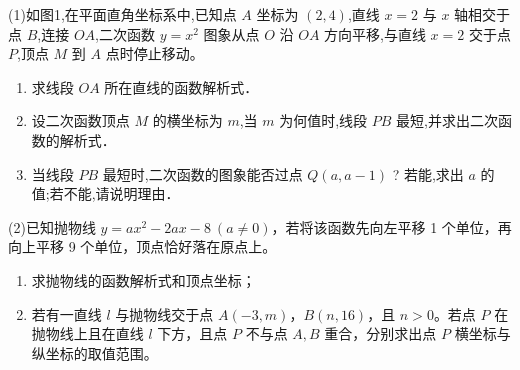 \documentclass[lang=cn, 10pt, titlestyle=display, oneside, toc=twocol]{elegantbook}
\begin{document}
\begin{exercise}
    \small
    \setlength{\parindent}{0pt} %
    \setlength{\columnseprule}{0.01pt}
    \begin{multicols}{2}
    (1)如图1,在平面直角坐标系中,已知点 \( A \) 坐标为 \((2,4)\),直线 \( x=2 \) 与 \( x \) 轴相交于点 \( B \),连接 \( OA \),二次函数 \( y=x^2 \) 图象从点 \( O \) 沿 \( OA \) 方向平移,与直线 \( x=2 \) 交于点 \( P \),顶点 \( M \) 到 \( A \) 点时停止移动。
        
    \begin{enumerate}
        \item 求线段 \( OA \) 所在直线的函数解析式．
        \item 设二次函数顶点 \( M \) 的横坐标为 \( m \),当 \( m \) 为何值时,线段 \( PB \) 最短,并求出二次函数的解析式．
        \item 当线段 \( PB \) 最短时,二次函数的图象能否过点 \( Q(a,a-1) \) ? 若能,求出 \( a \) 的值;若不能,请说明理由．
    \end{enumerate}




    (2)已知抛物线 \( y = ax^2 - 2ax - 8 \ (a \neq 0) \)，若将该函数先向左平移 1 个单位，再向上平移 9 个单位，顶点恰好落在原点上。

    \begin{enumerate}
        \item 求抛物线的函数解析式和顶点坐标；
        \item 若有一直线 \( l \) 与抛物线交于点 \( A(-3, m) \)，\( B(n, 16) \)，且 \( n > 0 \)。若点 \( P \) 在抛物线上且在直线 \( l \) 下方，且点 \( P \) 不与点 \( A, B \) 重合，分别求出点 \( P \) 横坐标与纵坐标的取值范围。
    \end{enumerate}
    
    \end{multicols}


\end{exercise}
\end{document}
